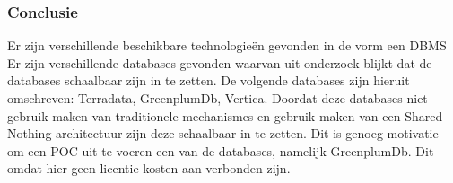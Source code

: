\subsubsection{\textbf{Conclusie}}

Er zijn verschillende beschikbare technologieën gevonden in de vorm een DBMS  Er zijn verschillende databases gevonden waarvan uit onderzoek blijkt dat de databases schaalbaar zijn in te zetten. De volgende databases zijn hieruit omschreven: Terradata, GreenplumDb, Vertica. Doordat deze databases niet gebruik maken van traditionele mechanismes en gebruik maken van een Shared Nothing architectuur zijn deze schaalbaar in te zetten. Dit is genoeg motivatie om een POC uit te voeren een van de databases, namelijk GreenplumDb. Dit omdat hier geen licentie kosten aan verbonden zijn.
